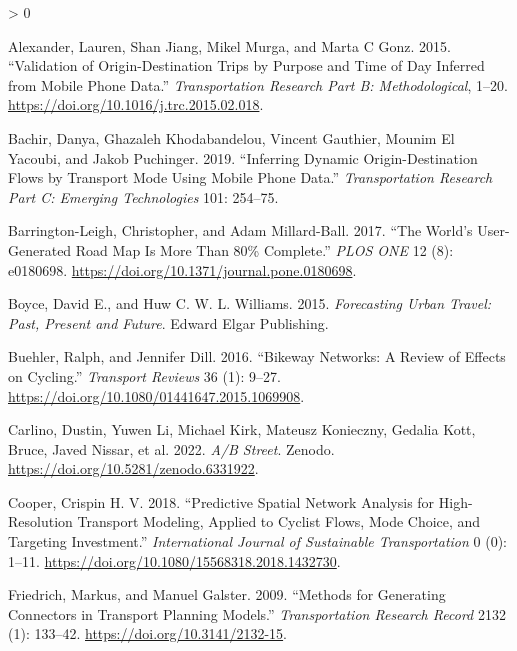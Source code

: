 \documentclass[
]{article}
\newlength{\cslhangindent}
\newenvironment{CSLReferences}[2] %
 {%
  \setlength{\parindent}{0pt}
  \ifodd #1 \everypar{\setlength{\hangindent}{\cslhangindent}}\ignorespaces\fi
  \ifnum #2 > 0
  \setlength{\parskip}{#2\baselineskip}
  \fi
 }%
 {}
\begin{document}
\hypertarget{refs}{}
\begin{CSLReferences}{1}{0}
\leavevmode\hypertarget{ref-alexander_validation_2015}{}%
Alexander, Lauren, Shan Jiang, Mikel Murga, and Marta C Gonz. 2015. {``Validation of Origin-Destination Trips by Purpose and Time of Day Inferred from Mobile Phone Data.''} \emph{Transportation Research Part B: Methodological}, 1--20. \url{https://doi.org/10.1016/j.trc.2015.02.018}.

\leavevmode\hypertarget{ref-bachir_inferring_2019}{}%
Bachir, Danya, Ghazaleh Khodabandelou, Vincent Gauthier, Mounim El Yacoubi, and Jakob Puchinger. 2019. {``Inferring Dynamic Origin-Destination Flows by Transport Mode Using Mobile Phone Data.''} \emph{Transportation Research Part C: Emerging Technologies} 101: 254--75.

\leavevmode\hypertarget{ref-barrington-leigh_world_2017}{}%
Barrington-Leigh, Christopher, and Adam Millard-Ball. 2017. {``The World's User-Generated Road Map Is More Than 80\% Complete.''} \emph{PLOS ONE} 12 (8): e0180698. \url{https://doi.org/10.1371/journal.pone.0180698}.

\leavevmode\hypertarget{ref-boyce_forecasting_2015}{}%
Boyce, David E., and Huw C. W. L. Williams. 2015. \emph{Forecasting {Urban Travel}: {Past}, {Present} and {Future}}. {Edward Elgar Publishing}.

\leavevmode\hypertarget{ref-buehler_bikeway_2016}{}%
Buehler, Ralph, and Jennifer Dill. 2016. {``Bikeway {Networks}: {A Review} of {Effects} on {Cycling}.''} \emph{Transport Reviews} 36 (1): 9--27. \url{https://doi.org/10.1080/01441647.2015.1069908}.

\leavevmode\hypertarget{ref-abstreet_2022}{}%
Carlino, Dustin, Yuwen Li, Michael Kirk, Mateusz Konieczny, Gedalia Kott, Bruce, Javed Nissar, et al. 2022. \emph{A/{B Street}}. {Zenodo}. \url{https://doi.org/10.5281/zenodo.6331922}.

\leavevmode\hypertarget{ref-cooper_predictive_2018}{}%
Cooper, Crispin H. V. 2018. {``Predictive Spatial Network Analysis for High-Resolution Transport Modeling, Applied to Cyclist Flows, Mode Choice, and Targeting Investment.''} \emph{International Journal of Sustainable Transportation} 0 (0): 1--11. \url{https://doi.org/10.1080/15568318.2018.1432730}.

\leavevmode\hypertarget{ref-friedrich_methods_2009}{}%
Friedrich, Markus, and Manuel Galster. 2009. {``Methods for {Generating Connectors} in {Transport Planning Models}.''} \emph{Transportation Research Record} 2132 (1): 133--42. \url{https://doi.org/10.3141/2132-15}.


\end{CSLReferences}
\end{document}
